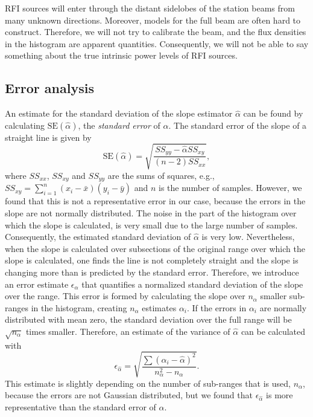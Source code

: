 \documentclass[useAMS,usenatbib]{mn2e}
\begin{document}
RFI sources will enter through the distant sidelobes of the station beams from many unknown directions. Moreover, models for the full beam are often hard to construct. Therefore, we will not try to calibrate the beam, and the flux densities in the histogram are apparent quantities. Consequently, we will not be able to say something about the true intrinsic power levels of RFI sources.

\subsection{Error analysis}
An estimate for the standard deviation of the slope estimator $\hat \alpha$ can be found by calculating $\textrm{SE}(\hat \alpha)$, the \emph{standard error} of $\hat \alpha$. The standard error of the slope of a straight line \citep[pp. 32--35]{acton-analaysis-of-straight-lines} is given by
\begin{equation} \label{eq:stderr-slope}
 \textrm{SE}(\hat \alpha) = \sqrt{\frac{SS_{yy}-\hat\alpha SS_{xy}}{\left(n - 2\right) SS_{xx}}},
\end{equation}
where $SS_{xx}$, $SS_{xy}$ and $SS_{yy}$ are the sums of squares, e.g., $SS_{xy}=\sum_{i=1}^n (x_i - \bar x) (y_i - \bar y)$ and $n$ is the number of samples. However, we found that this is not a representative error in our case, because the errors in the slope are not normally distributed. The noise in the part of the histogram over which the slope is calculated, is very small due to the large number of samples. Consequently, the estimated standard deviation of $\hat \alpha$ is very low. Nevertheless, when the slope is calculated over subsections of the original range over which the slope is calculated, one finds the line is not completely straight and the slope is changing more than is predicted by the standard error. Therefore, we introduce an error estimate $\epsilon_\alpha$ that quantifies a normalized standard deviation of the slope over the range. This error is formed by calculating the slope over $n_\alpha$ smaller sub-ranges in the histogram, creating $n_\alpha$ estimates $\alpha_i$. If the errors in $\alpha_i$ are normally distributed with mean zero, the standard deviation over the full range will be $\sqrt{n_\alpha}$ times smaller. Therefore, an estimate of the variance of $\hat \alpha$ can be calculated with
\begin{equation}
 \epsilon_{\hat\alpha} = \sqrt{\frac{\sum \left( \alpha_i - \hat\alpha \right)^2 }{n^2_\alpha - n_\alpha}}.
\end{equation}
This estimate is slightly depending on the number of sub-ranges that is used, $n_\alpha$, because the errors are not Gaussian distributed, but we found that $\epsilon_{\hat\alpha}$ is more representative than the standard error of $\hat\alpha$. 
\end{document}
